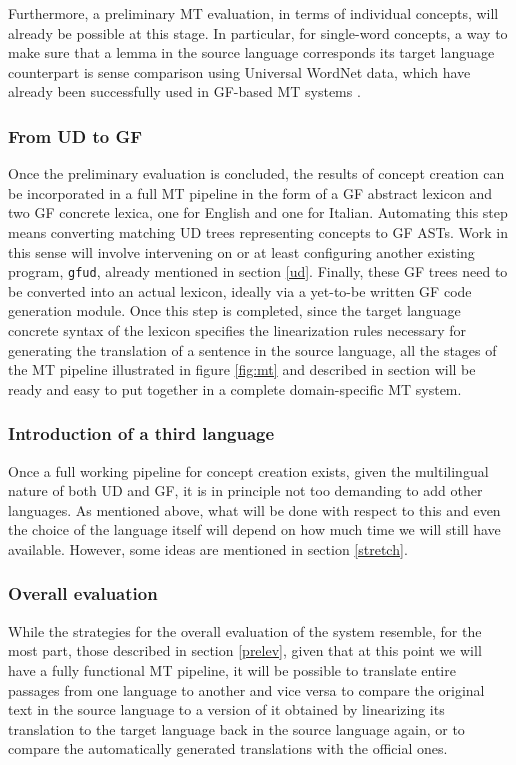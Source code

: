 \documentclass{article}
\begin{document}
Furthermore, a preliminary MT evaluation, in terms of individual concepts, will already be possible at this stage.
In particular, for single-word concepts, a way to make sure that a lemma in the source language corresponds its target language counterpart is sense comparison using Universal WordNet \cite{uwn} data, which have already been successfully used in GF-based MT systems \cite{wngf}. 

\subsubsection{From UD to GF}
Once the preliminary evaluation is concluded, the results of concept creation can be incorporated in a full MT pipeline in the form of a GF abstract lexicon and two GF concrete lexica, one for English and one for Italian.
Automating this step means converting matching UD trees representing concepts to GF ASTs. Work in this sense will involve intervening on or at least configuring another existing program, \texttt{gfud}, already mentioned in section \ref{ud}. Finally, these GF trees need to be converted into an actual lexicon, ideally via a yet-to-be written GF code generation module. Once this step is completed, since the target language concrete syntax of the lexicon specifies the linearization rules necessary for generating the translation of a sentence in the source language, all the stages of the MT pipeline illustrated in figure \ref{fig:mt} and described in section \label{objs} will be ready and easy to put together in a complete domain-specific MT system.

\subsubsection{Introduction of a third language}
Once a full working pipeline for concept creation exists, given the multilingual nature of both UD and GF, it is in principle not too demanding to add other languages. 
As mentioned above, what will be done with respect to this and even the choice of the language itself will depend on how much time we will still have available. However, some ideas are mentioned in section \ref{stretch}.

\subsubsection{Overall evaluation} \label{eval}
While the strategies for the overall evaluation of the system resemble, for the most part, those described in section \ref{prelev}, given that at this point we will have a fully functional MT pipeline, it will be possible to translate entire passages from one language to another and vice versa to compare the original text in the source language to a version of it obtained by linearizing its translation to the target language back in the source language again, or to compare the automatically generated translations with the official ones.   
\end{document}
